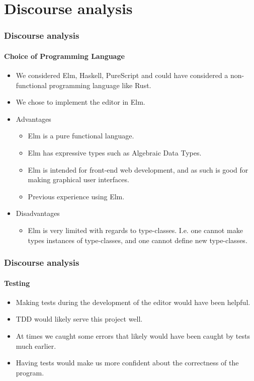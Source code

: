 \section{Discourse analysis}

\begin{frame}
    \frametitle{Discourse analysis}
    \framesubtitle{Choice of Programming Language}

    \begin{itemize}
        \item We considered Elm, Haskell, PureScript and could have considered
            a non-functional programming language like Rust.
            \pause
        \item We chose to implement the editor in Elm.
            \pause
        \item Advantages
            \begin{itemize}
                \item Elm is a pure functional language.
                    \pause
                \item Elm has expressive types such as Algebraic Data Types.
                    \pause
                \item Elm is intended for front-end web development, and as such
                    is good for making graphical user interfaces.
                    \pause
                \item Previous experience using Elm.
            \end{itemize}
        \item Disadvantages
            \begin{itemize}
                \item Elm is very limited with regards to type-classes. I.e. one
                    cannot make types instances of type-classes, and one cannot
                    define new type-classes.
            \end{itemize}
    \end{itemize}
\end{frame}

\begin{frame}
    \frametitle{Discourse analysis}
    \framesubtitle{Testing}

    \begin{itemize}
        \item Making tests during the development of the editor would have been
            helpful.
            \pause
        \item TDD would likely serve this project well.
            \pause
        \item At times we caught some errors that likely would have been caught
            by tests much earlier.
            \pause
        \item Having tests would make us more confident about the correctness of
            the program.
    \end{itemize}
\end{frame}
